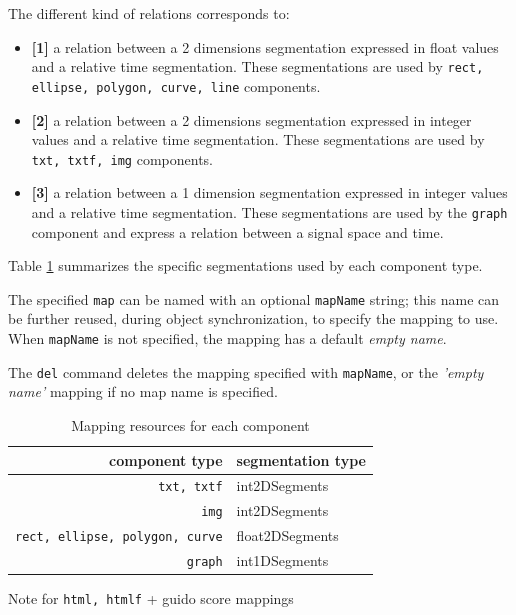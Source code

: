 \documentclass[a4paper,twoside]{report}
\newcommand{\OSC}[1]		{\texttt{#1}}
\begin{document}
The different kind of relations corresponds to:
\begin{itemize}
\item \textbf{[1]} a relation between a 2 dimensions segmentation expressed in float values and a relative time segmentation. These segmentations are used by \OSC{rect, ellipse, polygon, curve, line} components.
\item \textbf{[2]} a relation between a 2 dimensions segmentation expressed in integer values and a relative time segmentation. These segmentations are used by \OSC{txt, txtf, img} components. 
\item \textbf{[3]} a relation between a 1 dimension segmentation expressed in integer values and a relative time segmentation. These segmentations are used by the \OSC{graph} component and express a relation between a signal space and time.
\end{itemize}
Table \ref{maptable} summarizes the specific segmentations used by each component type. 

The specified \OSC{map} can be named with an optional \OSC{mapName} string; this name can be further reused, during object synchronization, to specify the mapping to use. When \OSC{mapName} is not specified, the mapping has a default \emph{empty name}.

The \OSC{del} command deletes the mapping specified with \OSC{mapName}, or the \emph{'empty name'} mapping if no map name is specified.


\begin{table}[htdp]
\caption{Mapping resources for each component}
\begin{center}
\begin{tabular}{|r|l|}
\hline
component type & segmentation type \\
\hline
\OSC{txt, txtf}		& int2DSegments \\
\OSC{img}			& int2DSegments \\
\OSC{rect, ellipse, polygon, curve}	&  float2DSegments \\
\OSC{graph}			&  int1DSegments \\
\hline
\end{tabular}
\end{center}
\label{maptable}
\end{table}

Note for \OSC{html, htmlf} + guido score mappings
\end{document}
